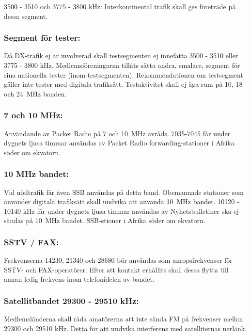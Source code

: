 3500 - 3510 och 3775 - 3800 kHz:
Interkontinental trafik skall ges företräde på dessa segment.

\subsubsection{Segment för tester:}

Då DX-trafik ej är involverad skall testsegmenten ej innefatta
3500 - 3510 eller 3775 - 3800 kHz. Medlemsföreningarna tillåts
sätta andra, smalare, segment för sina nationella tester
(inom testsegmenten). Rekommendationen om testsegment gäller
inte tester med digitala trafiksätt.
Testaktivitet skall ej äga rum på 10, 18 och 24~MHz banden.

\subsubsection{7 och 10 MHz:}

Användande av Packet Radio på 7 och 10~MHz avråds.
7035-7045 får under dygnets ljusa timmar användas av
Packet Radio forwarding-stationer i Afrika söder om
ekvatorn.

\subsubsection{10 MHz bandet:}

Vid nödtrafik får även SSB användas på detta band. Obemannade
stationer som använder digitala trafiksätt skall undvika att
använda 10~MHz bandet.
10120 - 10140 kHz får under dygnets ljusa timmar användas av
Nyhetsbulletiner ska ej sändas på 10~MHz bandet.
SSB-stioner i Afrika söder om ekvatorn.

\subsubsection{SSTV / FAX:}

Frekvenserna 14230, 21340 och 28680 bör användas
som anropsfrekvenser för SSTV- och FAX-operatörer.
Efter att kontakt erhållits skall dessa flytta till annan
ledig frekvens inom telefonidelen av bandet.

\subsubsection{Satellitbandet 29300 - 29510 kHz:}

Medlemsländerna skall råda amatörerna att inte sända
FM på frekvenser mellan 29300 och 29510 kHz. Detta
för att undvika interferens med satelliternas nerlänk.

